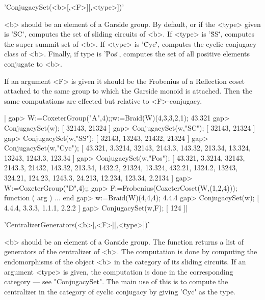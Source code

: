 

'ConjugacySet(<b>[,<F>][,<type>])'

<b>  should be an element of a Garside  group. By default, or if the <type>
given  is '\"SC\"', computes the set of  sliding circuits of <b>. If <type>
is  '\"SS\"', computes the super summit set of <b>. If <type> is '\"Cyc\"',
computes  the cyclic conjugacy class of <b>. Finally, if type is '\"Pos\"',
computes the set of all positive elements conjugate to <b>.

If  an argument  <F> is  given it  should be  the Frobenius of a Reflection
coset  attached to the same group to  which the Garside monoid is attached.
Then the same computations are effected but relative to <F>-conjugacy.

|    gap> W:=CoxeterGroup("A",4);;w:=Braid(W)(4,3,3,2,1);
    43.321
    gap> ConjugacySet(w);
    [ 32143, 21324 ]
    gap> ConjugacySet(w,"SC");
    [ 32143, 21324 ]
    gap> ConjugacySet(w,"SS");
    [ 32143, 13243, 21432, 21324 ]
    gap> ConjugacySet(w,"Cyc");
    [ 43.321, 3.3214, 32143, 2143.3, 143.32, 213.34, 13.324, 13243,
      1243.3, 123.34 ]
    gap> ConjugacySet(w,"Pos");
    [ 43.321, 3.3214, 32143, 2143.3, 21432, 143.32, 213.34, 1432.2,
      21324, 13.324, 432.21, 1324.2, 13243, 324.21, 124.23, 1243.3,
      24.213, 12.234, 123.34, 2.2134 ]
    gap> W:=CoxeterGroup("D",4);;
    gap> F:=Frobenius(CoxeterCoset(W,(1,2,4)));
    function ( arg ) ... end
    gap> w:=Braid(W)(4,4,4);
    4.4.4
    gap> ConjugacySet(w);
    [ 4.4.4, 3.3.3, 1.1.1, 2.2.2 ]
    gap> ConjugacySet(w,F);
    [ 124 ]|



'CentralizerGenerators(<b>[,<F>][,<type>])'

<b> should be an element of a Garside group. The function returns a list of
generators  of the centralizer of <b>. The computation is done by computing
the  endomorphisms  of  the  object  <b>  in  the  category  of its sliding
circuits.  If an argument <type>  is given, the computation  is done in the
corresponding  category --- see "ConjugacySet". The  main use of this is to
compute  the  centralizer  in  the  category  of cyclic conjugacy by giving
'\"Cyc\"' as the type.


